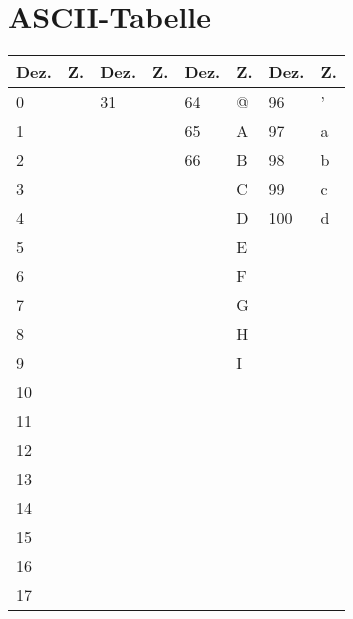 \section{ASCII-Tabelle}
\begin{table}[htp]
    \centering
    \begin{tabular}{|l|l||l|l||l|l||l|l|}
    \hline
    \textbf{Dez.} & \textbf{Z.} & \textbf{Dez.} & \textbf{Z.} & \textbf{Dez.} & \textbf{Z.} & \textbf{Dez.} & \textbf{Z.} \\ \hline\hline
    0    & ~       & 31   & ~       & 64   & @       & 96   & '       \\ \hline
    1    & ~       & ~    & ~       & 65   & A       & 97   & a       \\ \hline
    2    & ~       & ~    & ~       & 66   & B       & 98   & b       \\ \hline
    3    & ~       & ~    & ~       & ~    & C       & 99   & c       \\ \hline
    4    & ~       & ~    & ~       & ~    & D       & 100  & d       \\ \hline
    5    & ~       & ~    & ~       & ~    & E       & ~    & ~       \\ \hline
    6    & ~       & ~    & ~       & ~    & F       & ~    & ~       \\ \hline
    7    & ~       & ~    & ~       & ~    & G       & ~    & ~       \\ \hline
    8    & ~       & ~    & ~       & ~    & H       & ~    & ~       \\ \hline
    9    & ~       & ~    & ~       & ~    & I       & ~    & ~       \\ \hline
    10   & ~       & ~    & ~       & ~    & ~       & ~    & ~       \\ \hline
    11   & ~       & ~    & ~       & ~    & ~       & ~    & ~       \\ \hline
    12   & ~       & ~    & ~       & ~    & ~       & ~    & ~       \\ \hline
    13   & ~       & ~    & ~       & ~    & ~       & ~    & ~       \\ \hline
    14   & ~       & ~    & ~       & ~    & ~       & ~    & ~       \\ \hline
    15   & ~       & ~    & ~       & ~    & ~       & ~    & ~       \\ \hline
    16   & ~       & ~    & ~       & ~    & ~       & ~    & ~       \\ \hline
    17   & ~       & ~    & ~       & ~    & ~       & ~    & ~       \\ \hline

\end{tabular}
\end{table}
